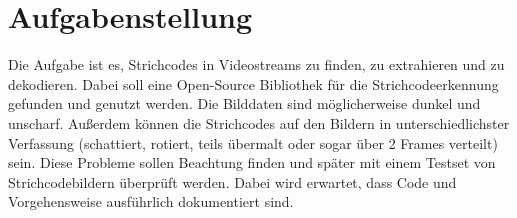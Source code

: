 \section{Aufgabenstellung}
Die Aufgabe ist es, Strichcodes in Videostreams zu finden, zu extrahieren und zu dekodieren.
Dabei soll eine Open-Source Bibliothek für die Strichcodeerkennung gefunden und genutzt werden.
Die Bilddaten sind möglicherweise dunkel und unscharf.
Außerdem können die Strichcodes auf den Bildern in unterschiedlichster Verfassung (schattiert, rotiert, teils übermalt oder sogar über 2 Frames verteilt) sein.
Diese Probleme sollen Beachtung finden und später mit einem Testset von Strichcodebildern überprüft werden.
Dabei wird erwartet, dass Code und Vorgehensweise ausführlich dokumentiert sind.

